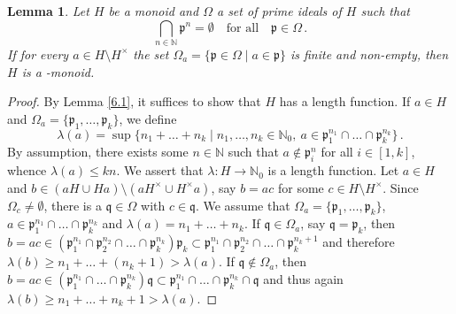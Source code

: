 \documentclass[a4paper]{amsart}
\newtheorem{lemma}[theorem]{Lemma}
\theoremstyle{definition}
\numberwithin{equation}{section}
\begin{document}
\medskip
\begin{lemma} \label{6.2}
Let  $H$ be a monoid and $\Omega$  a set of prime ideals of $H$ such
that
\[
\bigcap_{n \in {\mathbb N}} \mathfrak p^n = \emptyset \quad \text{for all}
\quad \mathfrak p \in \Omega\,.
\]
If for every $a \in H \setminus H^{\times}$ the set $\Omega_a = \{
\mathfrak p \in \Omega \mid a \in \mathfrak p \}$ is finite and
non-empty, then $H$ is a {}-monoid.
\end{lemma}

\begin{proof}
By Lemma \ref{6.1}, it suffices to show that $H$ has a length
function.  If $a \in H$ and $\Omega_a = \{\mathfrak p_1, \ldots,
\mathfrak p_k\}$, we define
\[
\lambda (a) = \sup \{ n_1 + \ldots + n_k \mid n_1, \ldots, n_k \in
{\mathbb N}_0, \ a \in \mathfrak p_1^{n_1} \cap \ldots \cap \mathfrak
p_k^{n_k} \} \,.
\]
By assumption, there exists some $n \in {\mathbb N}$ such that $a \notin
\mathfrak p_i^n$ for all $i \in [1,k]$, whence $\lambda (a) \le kn$.
We assert that $\lambda \colon H \to {\mathbb N}_0$ is a length function. Let
$a \in H$ and $b \in (aH \cup Ha) \setminus (aH^{\times} \cup
H^{\times}a)$, say $b = ac$ for some $c \in H \setminus H^{\times}$.
Since $\Omega_c \ne \emptyset$, there is a $\mathfrak q \in \Omega$
with $c \in \mathfrak q$. We assume that $\Omega_a = \{\mathfrak
p_1, \ldots, \mathfrak p_k\}$, \ $a \in \mathfrak p_1^{n_1} \cap
\ldots \cap \mathfrak p_k^{n_k}$ and $\lambda (a) = n_1+ \ldots
+n_k$. If $\mathfrak q \in \Omega_a$, say $\mathfrak q = \mathfrak
p_k$, then $b = ac \in (\mathfrak p_1^{n_1} \cap \mathfrak p_2^{n_2}
\cap \ldots \cap \mathfrak p_k^{n_k})\mathfrak p_k \subset \mathfrak
p_1^{n_1} \cap \mathfrak p_2^{n_2} \cap \ldots \cap \mathfrak
p_k^{n_k+1}$ and therefore $\lambda (b) \ge n_1 + \ldots +(n_k+1)
> \lambda (a)$. If $\mathfrak q \notin \Omega_a$,
then $b =ac \in ( \mathfrak p_1^{n_1} \cap \ldots \cap \mathfrak
p_k^{n_k})\mathfrak q \subset  \mathfrak p_1^{n_1} \cap \ldots \cap
\mathfrak p_k^{n_k} \cap \mathfrak q$ and thus again $\lambda (b)
\ge  n_1 + \ldots +n_k + 1 > \lambda (a)$.
\end{proof}
\end{document}
